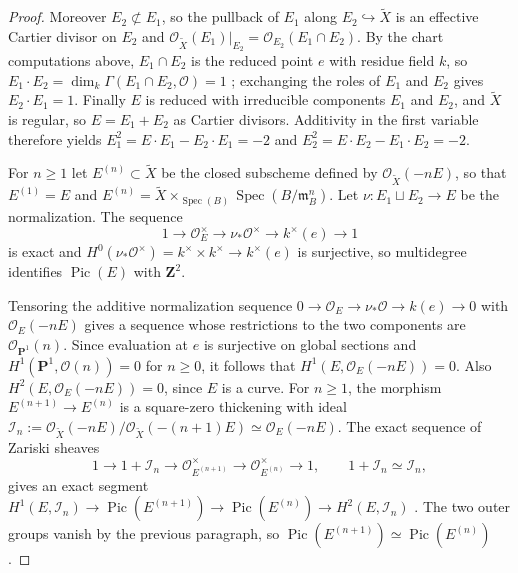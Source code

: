 \documentclass[10pt]{amsart}
\DeclareMathOperator{\Pic}{Pic}
\DeclareMathOperator{\Spec}{Spec}
\theoremstyle{remark}
\begin{document}
\begin{proof}
	Moreover \(E_2\not\subset E_1\), so the pullback of \(E_1\) along
	\(E_2\hookrightarrow\widetilde X\) is an effective Cartier divisor on
	\(E_2\) and
	\(\mathcal O_{\widetilde X}(E_1)|_{E_2}=\mathcal O_{E_2}(E_1\cap E_2)\).
	By the chart computations above, \(E_1\cap E_2\) is the reduced point
	\(e\) with residue field \(k\), so
	\(E_1\cdot E_2=\dim_k\Gamma(E_1\cap E_2,\mathcal O)=1\)
	\cite[Tag~0AYY]{StacksProject}; exchanging the roles of \(E_1\) and
	\(E_2\) gives \(E_2\cdot E_1=1\).  Finally \(E\) is reduced with
	irreducible components \(E_1\) and \(E_2\), and \(\widetilde X\) is
	regular, so \(E=E_1+E_2\) as Cartier divisors.  Additivity in the first
	variable therefore yields
	\(E_1^2=E\cdot E_1-E_2\cdot E_1=-2\) and
	\(E_2^2=E\cdot E_2-E_1\cdot E_2=-2\).
	
	
	
	
	
	For \(n\ge1\) let \(E^{(n)}\subset\widetilde X\) be the closed subscheme
	defined by \(\mathcal O_{\widetilde X}(-nE)\), so that \(E^{(1)}=E\) and
	\(E^{(n)}=\widetilde X\times_{\Spec(B)}\Spec(B/\mathfrak m_B^n)\).  Let
	\(\nu\colon E_1\sqcup E_2\to E\) be the normalization.  The sequence
	\[
	1\to\mathcal O_E^\times\to\nu_*\mathcal O^\times\to k^\times(e)\to1
	\]
	is exact and \(H^0(\nu_*\mathcal O^\times)=k^\times\times k^\times\to
	k^\times(e)\) is surjective, so multidegree identifies \(\Pic(E)\) with
	\(\mathbf Z^2\).  
	
	Tensoring the additive normalization sequence
	\(0\to\mathcal O_E\to\nu_*\mathcal O\to k(e)\to0\) with
	\(\mathcal O_E(-nE)\) gives a sequence whose restrictions to the two
	components are \(\mathcal O_{\mathbf P^1}(n)\).  Since evaluation at
	\(e\) is surjective on global sections and
	\(H^1(\mathbf P^1,\mathcal O(n))=0\) for \(n\ge0\), it follows that
	\(H^1(E,\mathcal O_E(-nE))=0\).  Also
	\(H^2(E,\mathcal O_E(-nE))=0\), since \(E\) is a curve. For \(n\ge1\), the morphism
	\(E^{(n+1)}\to E^{(n)}\) is a square-zero thickening with ideal
	\(\mathcal I_n:=
	\mathcal O_{\widetilde X}(-nE)/
	\mathcal O_{\widetilde X}(-(n+1)E)
	\simeq\mathcal O_E(-nE)\).
	The exact sequence of Zariski sheaves
	\[
	1\longrightarrow1+\mathcal I_n\longrightarrow
	\mathcal O_{E^{(n+1)}}^\times\longrightarrow
	\mathcal O_{E^{(n)}}^\times\longrightarrow1,
	\qquad 1+\mathcal I_n\simeq\mathcal I_n,
	\]
	gives an exact segment
	\(H^1(E,\mathcal I_n)\to\Pic(E^{(n+1)})\to
	\Pic(E^{(n)})\to H^2(E,\mathcal I_n)\)
	\cite[Tag~0C6R]{StacksProject}. The two outer groups vanish by the
	previous paragraph, so
	\(\Pic(E^{(n+1)})\simeq\Pic(E^{(n)})\).
	

\end{proof}
\end{document}

